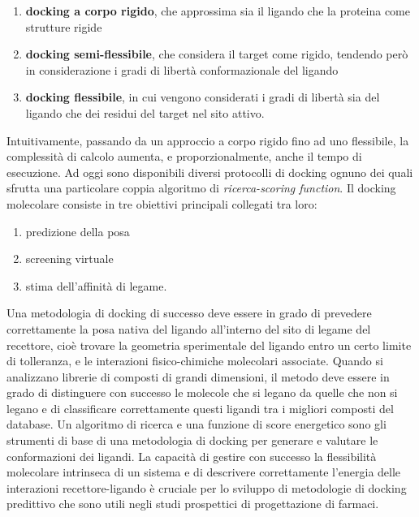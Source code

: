 \begin{enumerate}[label=\Roman{*}., ref=(\Roman{*})]
    \item \textbf{docking a corpo rigido}, che approssima sia il ligando che la proteina come strutture rigide
    \item \textbf{docking semi-flessibile}, che considera il target come rigido, tendendo però in considerazione i gradi di libertà conformazionale del ligando
    \item \textbf{docking flessibile}, in cui vengono considerati i gradi di libertà sia del ligando che dei residui del target nel sito attivo.
\end{enumerate}

Intuitivamente, passando da un approccio a corpo rigido fino ad uno flessibile, la complessità di calcolo aumenta, e proporzionalmente, anche il tempo di esecuzione.\newline
Ad oggi sono disponibili diversi protocolli di docking ognuno dei quali sfrutta una particolare coppia algoritmo di \textit{ricerca-scoring function}.\newline
Il docking molecolare consiste in tre obiettivi principali collegati tra loro: 

\begin{enumerate}[label=\arabic{*}., ref=(\arabic{*})]
    \item predizione della posa
    \item screening virtuale
    \item stima dell'affinità di legame.
\end{enumerate}

Una metodologia di docking di successo deve essere in grado di prevedere correttamente la posa nativa del ligando all'interno del sito di legame del recettore, cioè trovare la geometria sperimentale del ligando entro un certo limite di tolleranza, e le interazioni fisico-chimiche molecolari associate.\newline
Quando si analizzano librerie di composti di grandi dimensioni, il metodo deve essere in grado di distinguere con successo le molecole che si legano da quelle che non si legano e di classificare correttamente questi ligandi tra i migliori composti del database.\newline
Un algoritmo di ricerca e una funzione di score energetico sono gli strumenti di base di una metodologia di docking per generare e valutare le conformazioni dei ligandi. La capacità di gestire con successo la flessibilità molecolare intrinseca di un sistema e di descrivere correttamente l'energia delle interazioni recettore-ligando è cruciale per lo sviluppo di metodologie di docking predittivo che sono utili negli studi prospettici di progettazione di farmaci\cite{guedes2014receptor}.

